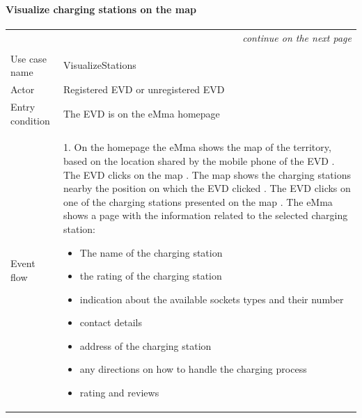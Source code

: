 \paragraph{Visualize charging stations on the map}
\begin{center}
    \begin{longtable}{p{4cm} p{11cm}}
    \multicolumn{2}{r}{\itshape{continue on the next page}}\\
    \endfoot 
    \\
    \endlastfoot
    \hline
     Use case name &  VisualizeStations\\
     \hline
     Actor & Registered EVD or unregistered EVD \\
     \hline
     Entry condition & The EVD is on the eMma homepage \\
     \hline
     Event flow &   1. On the homepage the eMma shows the map of the territory, based on the location shared by the mobile phone of the EVD \newline
                    2. The EVD clicks on the map \newline
                    3. The map shows the charging stations nearby the position on which the EVD clicked \newline
                    4. The EVD clicks on one of the charging stations presented on the map \newline
                    5. The eMma shows a page with the information related to the selected charging station:
                    \begin{adjustwidth}{0.5cm}{}
                        \begin{itemize}
                                \item The name of the charging station
                                \item the rating of the charging station
                                \item indication about the available sockets types and their number
                                \item contact details
                                \item address of the charging station
                                \item any directions on how to handle the charging process
                                \item rating and reviews
                        \end{itemize}
                    \end{adjustwidth}
                    

\end{longtable}
\end{center}
